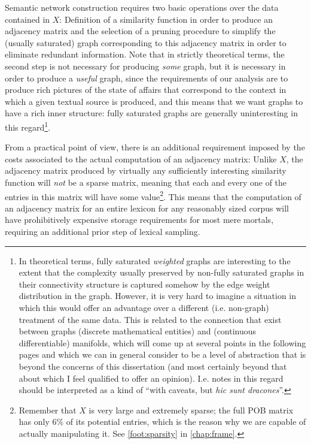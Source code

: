 Semantic network construction requires two basic operations over the data contained in $X$:
Definition of a similarity function in order to produce an adjacency matrix and the selection of a pruning procedure to simplify the (usually saturated) graph corresponding to this adjacency matrix in order to eliminate redundant information.
Note that in strictly theoretical terms, the second step is not necessary for producing \emph{some} graph, but it is necessary in order to produce a \emph{useful} graph, since the requirements of our analysis are to produce rich pictures of the state of affairs that correspond to the context in which a given textual source is produced, and this means that we want graphs to have a rich inner structure: fully saturated graphs are generally uninteresting in this regard\footnote{
    \label{foot:wgraphs}
    \label{foot:dracones}
    In theoretical terms, fully saturated \emph{weighted} graphs are interesting to the extent that the complexity usually preserved by non-fully saturated graphs in their connectivity structure is captured somehow by the edge weight distribution in the graph.
    However, it is very hard to imagine a situation in which this would offer an advantage over a different (i.e. non-graph) treatment of the same data.
    This is related to the connection that exist between graphs (discrete mathematical entities) and (continuous differentiable) manifolds, which will come up at several points in the following pages and which we can in general consider to be a level of abstraction that is beyond the concerns of this dissertation (and most certainly beyond that about which I feel qualified to offer an opinion).
    I.e. notes in this regard should be interpreted as a kind of ``with caveats, but \emph{hic sunt dracones}''.
}.

From a practical point of view, there is an additional requirement imposed by the costs associated to the actual computation of an adjacency matrix:
Unlike $X$, the adjacency matrix produced by virtually any sufficiently interesting similarity function will \emph{not} be a sparse matrix, meaning that each and every one of the entries in this matrix will have some value\footnote{
    Remember that $X$ is very large and extremely sparse; the full POB matrix has only $6\%$ of its potential entries, which is the reason why we are capable of actually manipulating it.
    See \autoref{foot:sparsity} in \autoref{chap:frame}.
}.
This means that the computation of an adjacency matrix for an entire lexicon for any reasonably sized corpus will have prohibitively expensive storage requirements for most mere mortals, requiring an additional prior step of lexical sampling.

